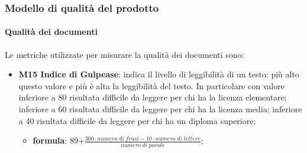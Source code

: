 \subsubsection{Modello di qualità del prodotto}
	\paragraph{Qualità dei documenti}
	Le metriche utilizzate per misurare la qualità dei documenti sono:
	\begin{itemize}
		\item \textbf{M15 Indice di Gulpease}: indica il livello di leggibilità di un testo: più alto questo valore e più è alta la leggibilità del testo. In particolare con valore inferiore a 80 risultata difficile da leggere per chi ha la licenza elementare; inferiore a 60 risultata difficile da leggere per chi ha la licenza media; inferiore a 40 risultata difficile da leggere per chi ha un diploma superiore;
		\begin{itemize}
			\item[] \textbf{formula}: 89+$\frac{300\cdot numero \; di \; frasi-10\cdot numero \; di \; lettere}{numero \; di \; parole}$;
		\end{itemize}                	
	\end{itemize}
